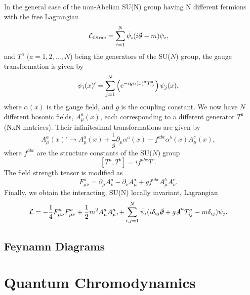 In the general case of the non-Abelian SU(N) group having N different fermions with the free Lagrangian
\begin{equation}
    \label{eq:Dirac_N}
    \mathcal{L}_{\text{Dirac}} = \sum_{i=1}^N \bar{\psi}_i (i\slashed{\partial} - m) \psi_i,
\end{equation}
and $T^a$ ($a = 1,2,..., N$) being the generators of the SU($N$) group, the gauge transformation is given by
\begin{equation}
    \label{eq:gauge_inv}
    \psi_i(x)' = \sum_{j=1}^N \left( \mathrm{e}^{-i g \alpha(x)^a T^a_{ij}}\right) \psi_j(x),
\end{equation}
where $\alpha(x)$ is the gauge field, and $g$ is the coupling constant.
We now have $N$ different bosonic fields, $A^a_\mu(x)$, each corresponding to a different generator $T^a$ (NxN matrices).
Their infinitesimal transformations are given by
\begin{equation}
    \label{eq:gauge_inv_bosons}
    A^a_\mu(x)' \rightarrow A^a_\mu(x) + \frac{1}{g} \partial_\mu \alpha^a(x) - f^{abc} \alpha^b(x) A^c_\mu(x),
\end{equation}
where $f^{abc}$ are the structure constants of the SU($N$) group
\begin{equation}
    \label{eq:structure_constants}
    [T^a, T^b] = i f^{abc} T^c.
\end{equation}
The field strength tensor is modified as 
\begin{equation}
    \label{eq:field_strength}
    F^a_{\mu\nu} = \partial_\mu A^a_\nu - \partial_\nu A^a_\mu + g f^{abc} A^b_\mu A^c_\nu.
\end{equation}
Finally, we obtain the interacting, SU(N) locally invariant,  Lagrangian
\begin{equation}
    \label{eq:lag_suN}
    \mathcal{L} = - \frac{1}{4}  F^a_{\mu\nu} F^a_{\mu\nu} + \frac{1}{2} m^2 A^a_\mu A^a_\mu, + \sum_{i,j=1}^N \bar{\psi}_i (i\delta_{ij} \slashed{\partial}  +g \slashed{A}^a T^a_{ij} - m \delta_{ij}) \psi_j.
\end{equation}


\subsection{Feynamn Diagrams}
\label{sec:feyman}









\section{Quantum Chromodynamics}
\label{sec:qed}

